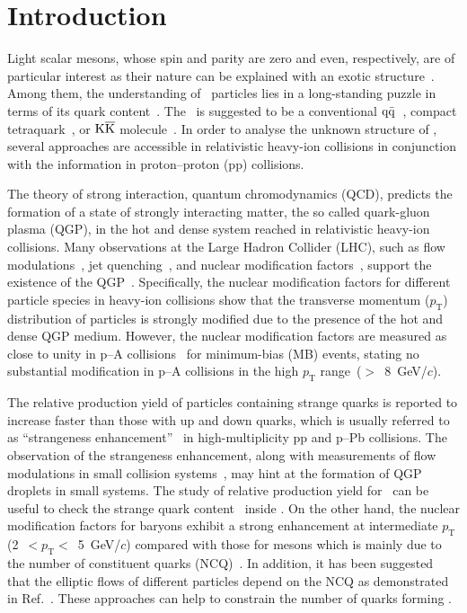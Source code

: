 
\section{Introduction}

Light scalar mesons, whose spin and parity are zero and even, respectively, are of particular interest as their nature can be explained with an exotic structure~\cite{ParticleDataGroup:2022pth}. Among them, the understanding of \fzero\ particles lies in a long-standing puzzle in terms of its quark content~\cite{ExHIC:2010gcb, Jaffe:1976ig, Maiani:2004uc}. The \fzero\ is suggested to be a conventional $\rm{}q\bar{q}$~\cite{Chen:2003za}, compact tetraquark~\cite{Achasov:2020aun}, or $\rm{}K\overline{K}$ molecule~\cite{Ahmed:2020kmp}. In order to analyse the unknown structure of \fzero, several approaches are accessible in relativistic heavy-ion collisions in conjunction with the information in proton--proton (pp) collisions. 

The theory of strong interaction, quantum chromodynamics (QCD), predicts the formation of a state of strongly interacting matter, the so called quark-gluon plasma (QGP), in the hot and dense system reached in relativistic heavy-ion collisions. Many observations at the Large Hadron Collider (LHC), such as flow modulations~\cite{Bhalerao:2020ulk, ALICE:2019zfl}, jet quenching~\cite{ALICE:2019qyj}, and nuclear modification factors~\cite{ALICE:2019hno}, support the existence of the QGP~\cite{Adams:2005dq}. Specifically, the nuclear modification factors for different particle species in heavy-ion collisions show that the transverse momentum ($p_{\mathrm{T}}$) distribution of particles is strongly modified due to the presence of the hot and dense QGP medium. However, the nuclear modification factors are measured as close to unity in p--A collisions~\cite{ALICE:2016dei} for minimum-bias (MB) events, stating no substantial modification in p--A collisions in the high $p_{\mathrm{T}}$ range~($>$~8~GeV/$c$). 

The relative production yield of particles containing strange quarks is reported to increase faster than those with up and down quarks, which is usually referred to as ``strangeness enhancement''~\cite{ALICE:2016fzo} in high-multiplicity pp and p--Pb collisions. The observation of the strangeness enhancement, along with measurements of flow modulations in small collision systems~\cite{PHENIX:2018lia, ALICE:2021nir}, may hint at the formation of QGP droplets in small systems. The study of relative production yield for \fzero\ can be useful to check the strange quark content~\cite{2014ooi, 2014vbo} inside \fzero. On the other hand, the nuclear modification factors for baryons exhibit a strong enhancement at intermediate $p_{\mathrm{T}}$ (2~$<p_{\mathrm{T}}<$~5~GeV/$c$) compared with those for mesons which is mainly due to the number of constituent quarks (NCQ)~\cite{Cronin:1974zm, Fries:2003vb}. In addition, it has been suggested that the elliptic flows of different particles depend on the NCQ as demonstrated in Ref.~\cite{Wang:2022det}. These approaches can help to constrain the number of quarks forming \fzero.

